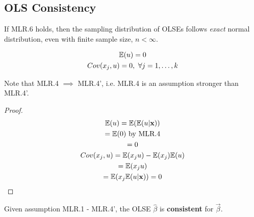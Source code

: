 \documentclass[]{article}
\begin{document}
		\subsection{OLS Consistency}
			\begin{remark}
				If MLR.6 holds, then the sampling distribution of OLSEs follows \emph{exact} normal distribution, even with finite sample size, $n < \infty$.
			\end{remark}
			
			\begin{assumption}[MLR.4']
				\begin{gather*}
					\mathbb{E}({u}) = 0 \\
					Cov(x_j, u) = 0,\ \forall j = 1,\dots,k
				\end{gather*}
			\end{assumption}
			\begin{proposition}
				Note that MLR.4 $\implies$ MLR.4', i.e. MLR.4 is an assumption stronger than MLR.4'.
				\begin{proof}
				\begin{gather*}
					\mathbb{E}({u}) = \mathbb{E}({\mathbb{E}({u|\textbf{x}})}) \\
					= \mathbb{E}({0}) \text{{ by MLR.4}} \\
					= 0 \\
					Cov(x_j, u) = \mathbb{E}({x_j u}) - \mathbb{E}({x_j}) \mathbb{E}({u}) \\
					= \mathbb{E}({x_j u}) \\
					= \mathbb{E}({x_j \mathbb{E}({u|\textbf{x}})}) = 0
				\end{gather*}
				\end{proof}
			\end{proposition}
		\begin{theorem}
			Given assumption MLR.1 - MLR.4', the OLSE $\hat{\beta}$ is \textbf{consistent} for $\vec{\beta}$.
		\end{theorem}
		
\end{document}
